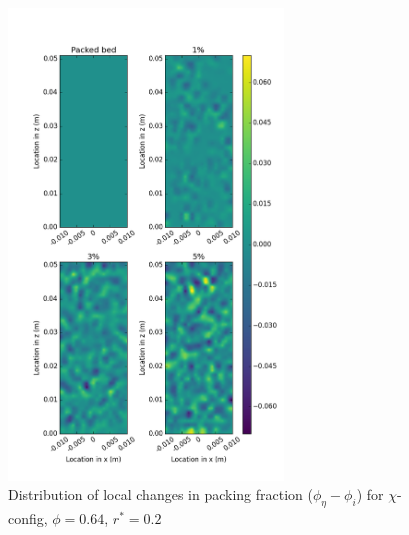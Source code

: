 \begin{figure}[!t]
    \centering
    \includegraphics[width = 0.65\textwidth]{figures/x-62-r125-1-deltas.png}
    \caption{Distribution of local changes in packing fraction ($\phi_{\eta} - \phi_i$) for $\chi$-config, $\phi = 0.64$, $r^* = 0.2$}\label{fig:x-624-r125-deltas}
\end{figure}



